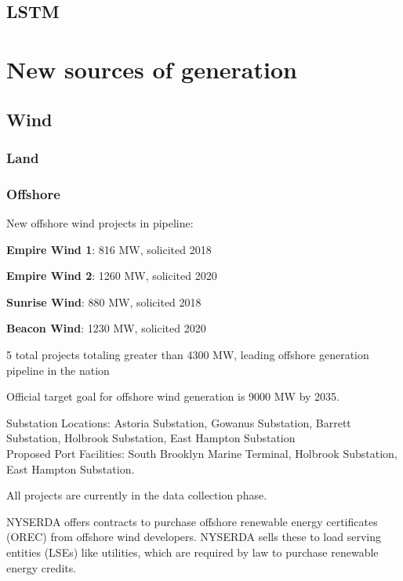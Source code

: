 \documentclass[plain]{article}
\newcommand{\1}{\mathbbm{1}}
\begin{document}
\subsection{LSTM}
\section{New sources of generation}
\subsection{Wind}

\subsubsection{Land}

\subsubsection{Offshore}
New offshore wind projects in pipeline:
\begin{tightlist}
	\item \textbf{Empire Wind 1}: 816 MW, solicited 2018 \cite{noauthor_new_nodate-1}
	\item \textbf{Empire Wind 2}: 1260 MW, solicited 2020 \cite{noauthor_new_nodate-1}
	\item \textbf{Sunrise Wind}: 880 MW, solicited 2018 \cite{noauthor_new_nodate-1}
	\item \textbf{Beacon Wind}: 1230 MW, solicited 2020 \cite{noauthor_new_nodate-1}
\end{tightlist}

5 total projects totaling greater than 4300 MW, leading offshore generation pipeline in the nation

Official target goal for offshore wind generation is 9000 MW by 2035. \cite{noauthor_us_nodate-1}

Substation Locations: Astoria Substation, Gowanus Substation, Barrett Substation, Holbrook Substation, East Hampton Substation\\
Proposed Port Facilities: South Brooklyn Marine Terminal, Holbrook Substation, East Hampton Substation. \cite{noauthor_new_nodate-1}

All projects are currently in the data collection phase. \cite{noauthor_new_nodate-1}

NYSERDA offers contracts to purchase offshore renewable energy certificates (OREC) from offshore wind developers. NYSERDA sells these to load serving entities (LSEs) like utilities, which are required by law to purchase renewable energy credits. \cite{NYSERDA_new_nodate-1}
\end{document}
